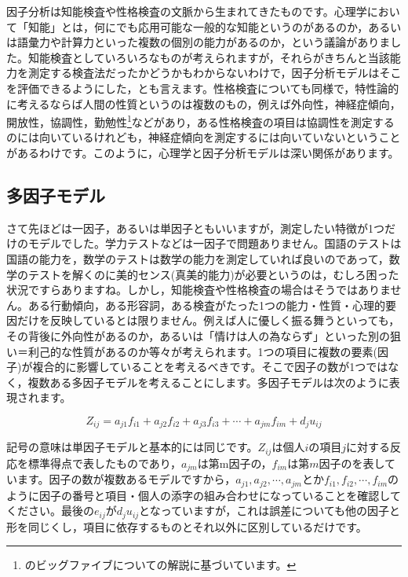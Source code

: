 \documentclass{ltjsbook}
\begin{document}
因子分析は知能検査や性格検査の文脈から生まれてきたものです。心理学において「知能」とは，何にでも応用可能な一般的な知能というのがあるのか，あるいは語彙力や計算力といった複数の個別の能力があるのか，という議論がありました。知能検査としていろいろなものが考えられますが，それらがきちんと当該能力を測定する検査法だったかどうかもわからないわけで，因子分析モデルはそこを評価できるようにした，とも言えます。性格検査についても同様で，特性論的に考えるならば人間の性質というのは複数のもの，例えば外向性，神経症傾向，開放性，協調性，勤勉性\footnote{\citet{小塩2020}のビッグファイブについての解説に基づいています。}などがあり，ある性格検査の項目は協調性を測定するのには向いているけれども，神経症傾向を測定するには向いていないということがあるわけです。このように，心理学と因子分析モデルは深い関係があります。

\subsection{多因子モデル}
さて先ほどは一因子，あるいは単因子ともいいますが，測定したい特徴が1つだけのモデルでした。学力テストなどは一因子で問題ありません。国語のテストは国語の能力を，数学のテストは数学の能力を測定していれば良いのであって，数学のテストを解くのに美的センス(真美的能力)が必要というのは，むしろ困った状況ですらありますね。しかし，知能検査や性格検査の場合はそうではありません。ある行動傾向，ある形容詞，ある検査がたった1つの能力・性質・心理的要因だけを反映しているとは限りません。例えば人に優しく振る舞うといっても，その背後に外向性があるのか，あるいは「情けは人の為ならず」といった別の狙い＝利己的な性質があるのか等々が考えられます。1つの項目に複数の要素(因子)が複合的に影響していることを考えるべきです。そこで因子の数が1つではなく，複数ある多因子モデルを考えることにします。多因子モデルは次のように表現されます。

\begin{equation}
    Z_{ij} = a_{j1}f_{i1} + a_{j2}f_{i2}+a_{j3}f_{i3} + \cdots + a_{jm}f_{im} + d_j u_{ij} 
    \label{factor}
\end{equation}

記号の意味は単因子モデルと基本的には同じです。$Z_{ij}$は個人$i$の項目$j$に対する反応を標準得点で表したものであり，$a_{jm}$は第m因子の，$f_{im}$は第$m$因子のを表しています。因子の数が複数あるモデルですから，$a_{j1},a_{j2},\cdots, a_{jm}$とか$f_{i1},f_{i2},\cdots, f_{im}$のように因子の番号と項目・個人の添字の組み合わせになっていることを確認してください。最後の$e_{ij}$が$d_j u_{ij}$となっていますが，これは誤差についても他の因子と形を同じくし，項目に依存するものとそれ以外に区別しているだけです。
\end{document}
